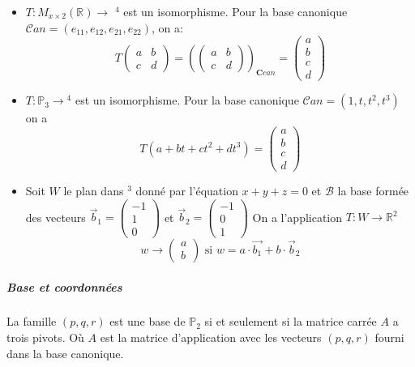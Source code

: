\begin{exemple}
    \begin{itemize}
        \item $T : M_{x\times2}(\mathbb{R}) \to $ \R$^4$ est un isomorphisme. Pour la base canonique $\mathcal{C}an = (e_{11}, e_{12}, e_{21}, e_{22})$, on a:
\[T\begin{pmatrix}
    a & b \\ c & d
\end{pmatrix} = \left ( \begin{pmatrix}
    a & b \\ c & d
\end{pmatrix}\right )_{\mathbf{C}can} = \begin{pmatrix}
    a \\ b \\ c \\ d
\end{pmatrix}\]
        \item $T : \mathbb{P}_3 \to $\R$^4$ est un isomorphisme. Pour la base canonique $\mathcal{C}an = (1, t, t^2, t^3)$ on a
\[T(a + bt + ct^2 + dt^3) = \begin{pmatrix}
    a \\ b \\ c \\ d
\end{pmatrix}\]
\item Soit $W$ le plan dans \R$^3$ donné par l'équation $x + y + z = 0$ et $\mathcal{B}$ la base formée des vecteurs $\vec{b}_1 = \begin{pmatrix}
    -1 \\ 1 \\ 0
\end{pmatrix}$ et $\vec{b}_2 =  \begin{pmatrix}
    -1 \\ 0 \\ 1
\end{pmatrix}$
On a l'application $T : W \to \mathbb{R}^2$
\[w \to \begin{pmatrix}
    a \\ b
\end{pmatrix} \text{ si } w = a\cdot\vec{b_1} + b\cdot\vec{b}_2\]
\end{itemize}

\end{exemple}


\subparagraph{Base et coordonnées}
\begin{definition}[pivots]
    La famille $(p, q, r)$ est une base de $\mathbb{P}_2$ si et seulement si la matrice carrée $A$ a trois pivots. Où $A$ est la matrice d'application avec les vecteurs $(p, q, r)$ fourni dans la base canonique.
\end{definition}

